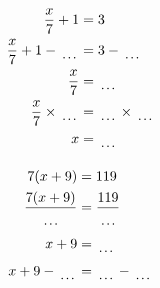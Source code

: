\documentclass[12pt]{article}
\newcounter{minipagecount}
\begin{document}
\begin{multicols}{2}
\begin{minipage}[t]{0.45\textwidth}
    \raggedright %
    \begin{align*} %
        \frac{x}{7} + 1 &= 3\\
        \frac{x}{7} + 1 - \dotuline{\hspace{5mm}} &= 3 - \dotuline{\hspace{5mm}}\\
        \frac{x}{7} &= \dotuline{\hspace{5mm}}\\
        \frac{x}{7} \times\dotuline{\hspace{5mm}} &= \dotuline{\hspace{5mm}} \times\dotuline{\hspace{5mm}}\\
        x &= \dotuline{\hspace{5mm}}\\
    \end{align*}
\end{minipage} %
\noindent{(\theminipagecount)}\hspace{0.1mm} %
\begin{minipage}[t]{0.45\textwidth} %
    \vspace{-26pt}  %
    \raggedright %
    \begin{align*} %
        7(x + 9) &= 119\\
        \frac{7(x+9)}{\dotuline{\hspace{5mm}}} &= \frac{119}{\dotuline{\hspace{5mm}}}\\
        x + 9 &= \dotuline{\hspace{5mm}}\\
        x + 9 - \dotuline{\hspace{5mm}} &= \dotuline{\hspace{5mm}} - \dotuline{\hspace{5mm}}\\

\end{align*}
\end{minipage}
\end{multicols}
\end{document}
